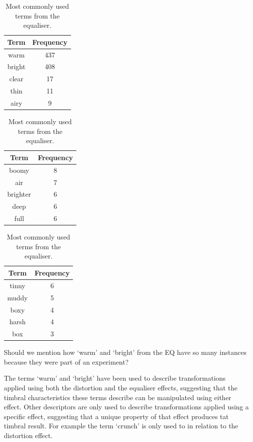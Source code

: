 		\begin{table}[h!]
			\centering
			\begin{tabular}{|c|c|}
				\hline
				\bf{Term} & \bf{Frequency} \\
				\hline
				\hline
				warm & 437 \\
				\hline
				bright & 408 \\
				\hline
				clear & 17 \\
				\hline
				thin & 11 \\
				\hline
				airy & 9 \\
				\hline
			\end{tabular}
			\qquad
			\begin{tabular}{|c|c|}
				\hline
				\bf{Term} & \bf{Frequency} \\
				\hline
				\hline
				boomy & 8 \\
				\hline
				air & 7 \\
				\hline
				brighter & 6 \\
				\hline
				deep & 6 \\
				\hline
				full & 6 \\
				\hline
			\end{tabular}
			\qquad
			\begin{tabular}{|c|c|}
				\hline
				\bf{Term} & \bf{Frequency} \\
				\hline
				\hline
				tinny & 6 \\
				\hline
				muddy & 5 \\
				\hline
				boxy & 4 \\
				\hline
				harsh & 4 \\
				\hline
				box & 3 \\
				\hline
			\end{tabular}
			\caption{Most commonly used terms from the equaliser.}
			\label{tab:EqualiserTerms}
		\end{table}

		\note
		{
			Should we mention how `warm' and `bright' from the EQ have so many instances because they were part
			of an experiment?
		}

		The terms `warm' and `bright' have been used to describe transformations applied using both the distortion
		and the equaliser effects, suggesting that the timbral characteristics these terms describe can be
		manipulated using either effect. Other descriptors are only used to describe transformations applied using a
		specific effect, suggesting that a unique property of that effect produces tat timbral result. For example
		the term `crunch' is only used to in relation to the distortion effect.


